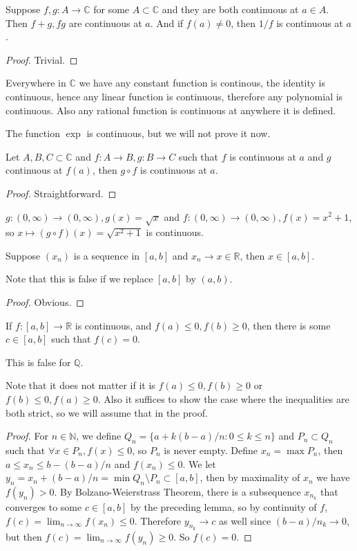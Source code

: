 \begin{proposition}
    Suppose $f,g:A\to\mathbb C$ for some $A\subset\mathbb C$ and they are both continuous at $a\in A$.
    Then $f+g,fg$ are continuous at $a$.
    And if $f(a)\neq 0$, then $1/f$ is continuous at $a$.
\end{proposition}
\begin{proof}
    Trivial.
\end{proof}
\begin{example}
    Everywhere in $\mathbb C$ we have any constant function is continous, the identity is continuous, hence any linear function is continuous, therefore any polynomial is continuous.
    Also any rational function is continuous at anywhere it is defined.
\end{example}
The function $\exp$ is continuous, but we will not prove it now.
\begin{proposition}
    Let $A,B,C\subset\mathbb C$ and $f:A\to B,g:B\to C$ such that $f$ is continuous at $a$ and $g$ continuous at $f(a)$, then $g\circ f$ is continuous at $a$.
\end{proposition}
\begin{proof}
    Straightforward.
\end{proof}
\begin{example}
    $g:(0,\infty)\to (0,\infty),g(x)=\sqrt{x}$ and $f:(0,\infty)\to(0,\infty),f(x)=x^2+1$, so $x\mapsto (g\circ f)(x)=\sqrt{x^2+1}$ is continuous.
\end{example}
\begin{lemma}
    Suppose $(x_n)$ is a sequence in $[a,b]$ and $x_n\to x\in\mathbb R$, then $x\in [a,b]$.
\end{lemma}
Note that this is false if we replace $[a,b]$ by $(a,b)$.
\begin{proof}
    Obvious.
\end{proof}
\begin{theorem}
    If $f:[a,b]\to\mathbb R$ is continuous, and $f(a)\le0,f(b)\ge0$, then there is some $c\in [a,b]$ such that $f(c)=0$.
\end{theorem}
This is false for $\mathbb Q$.
\begin{remark}
    Note that it does not matter if it is $f(a)\le0,f(b)\ge0$ or $f(b)\le0,f(a)\ge0$.
    Also it suffices to show the case where the inequalities are both strict, so we will assume that in the proof.
\end{remark}
\begin{proof}
    For $n\in\mathbb N$, we define $Q_n=\{a+k(b-a)/n:0\le k\le n\}$ and $P_n\subset Q_n$ such that $\forall x\in P_n,f(x)\le 0$, so $P_n$ is never empty.
    Define $x_n=\max P_n$, then $a\le x_n\le b-(b-a)/n$ and $f(x_n)\le 0$.
    We let $y_n=x_n+(b-a)/n=\min Q_n\setminus P_n\subset [a,b]$, then by maximality of $x_n$ we have $f(y_n)>0$.
    By Bolzano-Weierstrass Theorem, there is a subsequence $x_{n_k}$ that converges to some $c\in [a,b]$ by the preceding lemma, so by continuity of $f$, $f(c)=\lim_{n\to\infty}f(x_n)\le 0$.
    Therefore $y_{n_k}\to c$ as well since $(b-a)/n_k\to 0$, but then $f(c)=\lim_{n\to\infty}f(y_n)\ge 0$.
    So $f(c)=0$.
\end{proof}
